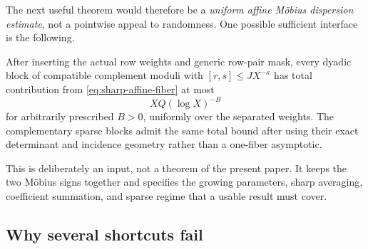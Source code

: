 The next useful theorem would therefore be a \emph{uniform affine
M\"obius dispersion estimate}, not a pointwise appeal to randomness.
One possible sufficient interface is the following.

\begin{assumption}
\label{ass:uniform-affine-dispersion}
After inserting the actual row weights and generic row-pair mask, every
dyadic block of compatible complement moduli with
\([r,s]\le JX^{-\kappa}\) has total contribution from
\eqref{eq:sharp-affine-fiber} at most
\begin{equation}
 XQ(\log X)^{-B}
 \label{eq:uniform-affine-gate}
\end{equation}
for arbitrarily prescribed \(B>0\), uniformly over the separated
weights.  The complementary sparse blocks admit the same total bound
after using their exact determinant and incidence geometry rather than
a one-fiber asymptotic.
\end{assumption}

This is deliberately an input, not a theorem of the present paper.  It
keeps the two M\"obius signs together and specifies the growing
parameters, sharp averaging, coefficient summation, and sparse regime
that a usable result must cover.

\subsection{Why several shortcuts fail}


